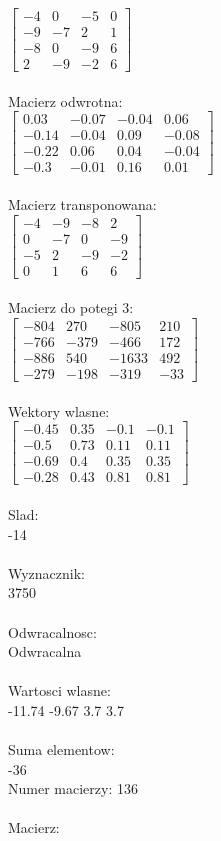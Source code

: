 \documentclass[a4paper,12pt]{article}
\begin{document}
$\begin{bmatrix} -4&0&-5&0\\-9&-7&2&1\\-8&0&-9&6\\2&-9&-2&6 \end{bmatrix}$
\\
\\
Macierz odwrotna:\\

$\begin{bmatrix} 0.03&-0.07&-0.04&0.06\\-0.14&-0.04&0.09&-0.08\\-0.22&0.06&0.04&-0.04\\-0.3&-0.01&0.16&0.01 \end{bmatrix}$
\\
\\
Macierz transponowana:\\

$\begin{bmatrix} -4&-9&-8&2\\0&-7&0&-9\\-5&2&-9&-2\\0&1&6&6 \end{bmatrix}$
\\
\\
Macierz do potegi 3:\\

$\begin{bmatrix} -804&270&-805&210\\-766&-379&-466&172\\-886&540&-1633&492\\-279&-198&-319&-33 \end{bmatrix}$
\\
\\
Wektory wlasne:\\

$\begin{bmatrix} -0.45&0.35&-0.1&-0.1\\-0.5&0.73&0.11&0.11\\-0.69&0.4&0.35&0.35\\-0.28&0.43&0.81&0.81 \end{bmatrix}$
\\
\\
Slad:\\
-14
\\
\\
Wyznacznik:\\
3750
\\
\\
Odwracalnosc:\\
Odwracalna
\\
\\
Wartosci wlasne:\\
-11.74 -9.67 3.7 3.7
\\
\\
Suma elementow:\\
-36
\\
\newpage
Numer macierzy:
136
\\
\\
Macierz:\\
\end{document}
